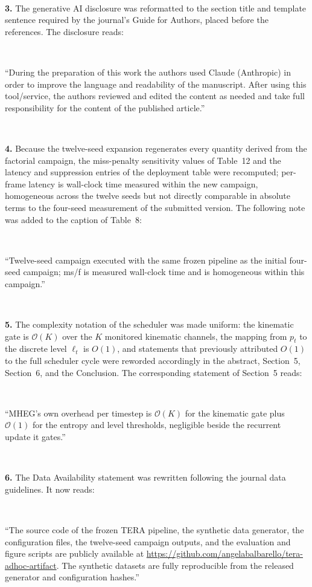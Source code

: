 \documentclass[1p,12pt,authoryear]{elsarticle}
\begin{document}
~

\noindent \textbf{3.} The generative AI disclosure was reformatted to the section title and template sentence required by the journal's Guide for Authors, placed before the references. The disclosure reads:

~

``During the preparation of this work the authors used Claude (Anthropic) in order to improve the language and readability of the manuscript. After using this tool/service, the authors reviewed and edited the content as needed and take full responsibility for the content of the published article.''

~

\noindent \textbf{4.} Because the twelve-seed expansion regenerates every quantity derived from the factorial campaign, the miss-penalty sensitivity values of Table~12 and the latency and suppression entries of the deployment table were recomputed; per-frame latency is wall-clock time measured within the new campaign, homogeneous across the twelve seeds but not directly comparable in absolute terms to the four-seed measurement of the submitted version. The following note was added to the caption of Table~8:

~

``Twelve-seed campaign executed with the same frozen pipeline as the initial four-seed campaign; ms/f is measured wall-clock time and is homogeneous within this campaign.''

~

\noindent \textbf{5.} The complexity notation of the scheduler was made uniform: the kinematic gate is $\mathcal{O}(K)$ over the $K$ monitored kinematic channels, the mapping from $p_t$ to the discrete level $\ell_t$ is $O(1)$, and statements that previously attributed $O(1)$ to the full scheduler cycle were reworded accordingly in the abstract, Section~5, Section~6, and the Conclusion. The corresponding statement of Section~5 reads:

~

``MHEG's own overhead per timestep is $\mathcal{O}(K)$ for the kinematic gate plus $\mathcal{O}(1)$ for the entropy and level thresholds, negligible beside the recurrent update it gates.''

~

\noindent \textbf{6.} The Data Availability statement was rewritten following the journal data guidelines. It now reads:

~

``The source code of the frozen TERA pipeline, the synthetic data generator, the configuration files, the twelve-seed campaign outputs, and the evaluation and figure scripts are publicly available at \url{https://github.com/angelabalbarello/tera-adhoc-artifact}. The synthetic datasets are fully reproducible from the released generator and configuration hashes.''
\end{document}
